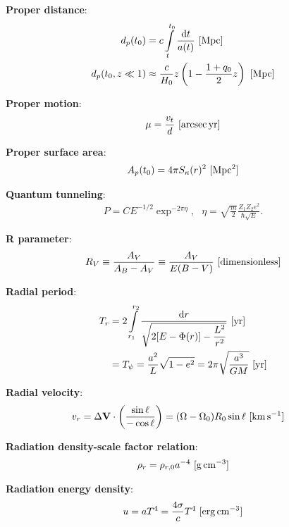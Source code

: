 \documentclass[a4paper,10pt]{article}
\begin{document}
{\noindent}\textbf{Proper distance}:
\begin{align*}
    d_p(t_0) &= c\int\limits_t^{t_0}\frac{\mathrm{d}t}{a(t)} ~ [{\rm Mpc}] \\
    d_p(t_0,z\ll1) &\approx \frac{c}{H_0}z \left(1-\frac{1+q_0}{2}z\right) ~ [{\rm Mpc}]
\end{align*}

{\noindent}\textbf{Proper motion}:
\begin{align*}
    \mu = \frac{v_t}{d} ~ [{\rm arcsec\,yr}]
\end{align*}

{\noindent}\textbf{Proper surface area}:
\begin{align*}
    A_p(t_0) = 4\pi S_\kappa(r)^2 ~ [{\rm Mpc^2}]
\end{align*}

{\noindent}\textbf{Quantum tunneling}:
\begin{align*}
    P = CE^{-1/2}\exp^{-2\pi\eta}, ~~~ \eta=\sqrt{\frac{m}{2}}\frac{Z_1Z_2e^2}{\hbar\sqrt{E}}.
\end{align*}

{\noindent}\textbf{R parameter}:
\begin{align*}
    R_V \equiv \frac{A_V}{A_B-A_V} \equiv \frac{A_V}{E(B-V)} ~ [{\rm dimensionless}]
\end{align*}

{\noindent}\textbf{Radial period}:
\begin{align*}
    T_r &= 2\int\limits_{r_1}^{r_2} \frac{{\rm d}r}{\sqrt{2[E-\Phi(r)]-\dfrac{L^2}{r^2}}} ~ [{\rm yr}] \\
    &= T_\psi = \frac{a^2}{L}\sqrt{1-e^2} = 2\pi\sqrt{\frac{a^3}{GM}} ~ [{\rm yr}]
\end{align*}

{\noindent}\textbf{Radial velocity}:
\begin{align*}
    v_r &= \Delta\mathbf{V}\cdot\left(\frac{\sin\ell}{-\cos\ell}\right) = (\Omega-\Omega_0)R_0\sin\ell ~ [{\rm km\,s^{-1}}]
\end{align*}

{\noindent}\textbf{Radiation density-scale factor relation}:
\begin{align*}
    \rho_r = \rho_{r,0}a^{-4} ~ [{\rm g\,cm^{-3}}]
\end{align*}

{\noindent}\textbf{Radiation energy density}:
\begin{align*}
    u = aT^4 = \frac{4\sigma}{c}T^4 ~ [{\rm erg\,cm^{-3}}]
\end{align*}
\end{document}

